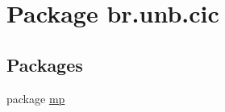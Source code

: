 \hypertarget{namespacebr_1_1unb_1_1cic}{}\section{Package br.\+unb.\+cic}
\label{namespacebr_1_1unb_1_1cic}
\subsection*{Packages}
\begin{DoxyCompactItemize}
\item 
package \mbox{\hyperlink{namespacebr_1_1unb_1_1cic_1_1mp}{mp}}
\end{DoxyCompactItemize}
